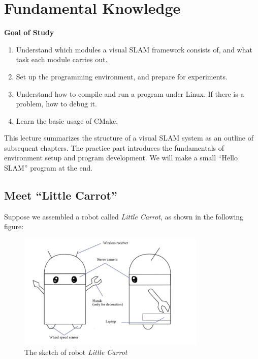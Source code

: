 \chapter{Fundamental Knowledge}
\label{cpt:2}
\begin{mdframed}
	\textbf{Goal of Study}
	\begin{enumerate}[labelindent=0em,leftmargin=1.5em]
		\item Understand which modules a visual SLAM framework consists of, and what task each module carries out.
		\item Set up the programming environment, and prepare for experiments.
		\item Understand how to compile and run a program under Linux. If there is a problem, how to debug it.
		\item Learn the basic usage of CMake.
	\end{enumerate}
\end{mdframed}

This lecture summarizes the structure of a visual SLAM system as an outline of subsequent chapters. The practice part introduces the fundamentals of environment setup and program development. We will make a small ``Hello SLAM'' program at the end.

\newpage

\newpage

\section{Meet ``Little Carrot''}
Suppose we assembled a robot called \emph{Little Carrot}, as shown in the following figure:

\begin{figure}
	\centering
	\includegraphics[width=0.8\textwidth]{resources/whatIsSLAM/carrot.pdf}
	\caption{The sketch of robot \emph{Little Carrot}}
\end{figure}

